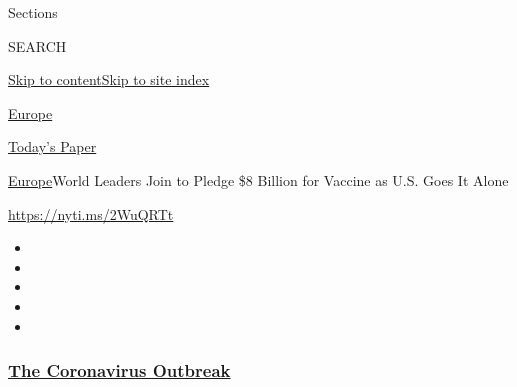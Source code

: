 Sections

SEARCH

\protect\hyperlink{site-content}{Skip to
content}\protect\hyperlink{site-index}{Skip to site index}

\href{https://www.nytimes3xbfgragh.onion/section/world/europe}{Europe}

\href{https://myaccount.nytimes3xbfgragh.onion/auth/login?response_type=cookie\&client_id=vi}{}

\href{https://www.nytimes3xbfgragh.onion/section/todayspaper}{Today's
Paper}

\href{/section/world/europe}{Europe}\textbar{}World Leaders Join to
Pledge \$8 Billion for Vaccine as U.S. Goes It Alone

\url{https://nyti.ms/2WuQRTt}

\begin{itemize}
\item
\item
\item
\item
\item
\end{itemize}

\hypertarget{the-coronavirus-outbreak}{%
\subsubsection{\texorpdfstring{\href{https://www.nytimes3xbfgragh.onion/news-event/coronavirus?name=styln-coronavirus-national\&region=TOP_BANNER\&block=storyline_menu_recirc\&action=click\&pgtype=Article\&impression_id=57bb2720-efba-11ea-a451-8f437b65897e\&variant=undefined}{The
Coronavirus
Outbreak}}{The Coronavirus Outbreak}}\label{the-coronavirus-outbreak}}


